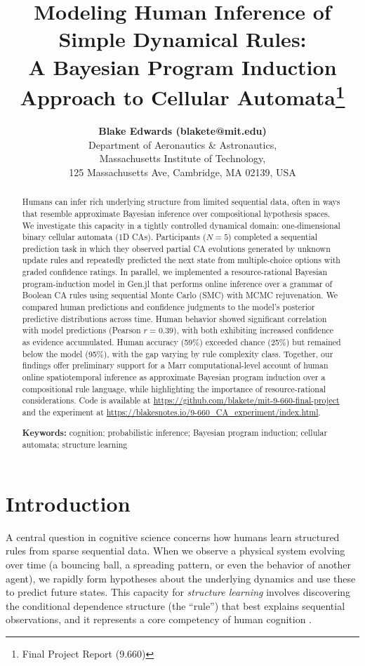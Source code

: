 \documentclass[10pt,letterpaper]{article}
\title{Modeling Human Inference of Simple Dynamical Rules: \\ A Bayesian Program Induction Approach to Cellular Automata\thanks{Final Project Report (9.660)}}
\author{{\large \bf Blake Edwards (blakete@mit.edu)} \\
  Department of Aeronautics \& Astronautics, \\
  Massachusetts Institute of Technology, \\
  125 Massachusetts Ave, Cambridge, MA 02139, USA}
\begin{document}
\maketitle


\begin{abstract}
Humans can infer rich underlying structure from limited sequential data, often in ways that resemble approximate Bayesian inference over compositional hypothesis spaces. We investigate this capacity in a tightly controlled dynamical domain: one-dimensional binary cellular automata (1D CAs). Participants ($N=5$) completed a sequential prediction task in which they observed partial CA evolutions generated by unknown update rules and repeatedly predicted the next state from multiple-choice options with graded confidence ratings. In parallel, we implemented a resource-rational Bayesian program-induction model in Gen.jl that performs online inference over a grammar of Boolean CA rules using sequential Monte Carlo (SMC) with MCMC rejuvenation. We compared human predictions and confidence judgments to the model's posterior predictive distributions across time. Human behavior showed significant correlation with model predictions (Pearson $r = 0.39$), with both exhibiting increased confidence as evidence accumulated. Human accuracy (59\%) exceeded chance (25\%) but remained below the model (95\%), with the gap varying by rule complexity class. Together, our findings offer preliminary support for a Marr computational-level account of human online spatiotemporal inference as approximate Bayesian program induction over a compositional rule language, while highlighting the importance of resource-rational considerations. Code is available at \url{https://github.com/blakete/mit-9-660-final-project} and the experiment at \url{https://blakesnotes.io/9-660_CA_experiment/index.html}.

\textbf{Keywords:} 
cognition; probabilistic inference; Bayesian program induction; cellular automata; structure learning
\end{abstract}


\section{Introduction}

A central question in cognitive science concerns how humans learn structured rules from sparse sequential data. When we observe a physical system evolving over time (a bouncing ball, a spreading pattern, or even the behavior of another agent), we rapidly form hypotheses about the underlying dynamics and use these to predict future states. This capacity for \textit{structure learning} involves discovering the conditional dependence structure (the ``rule'') that best explains sequential observations, and it represents a core competency of human cognition \cite{tenenbaum2006theory}.
\end{document}
